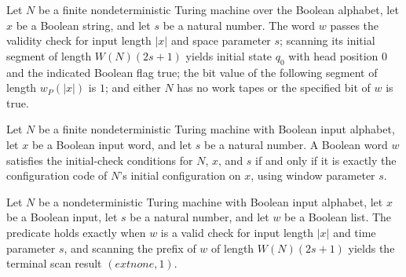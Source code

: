 \begin{definition}
\label{Complexity.Codec.InitChk}
\leanok
{}
Let $N$ be a finite nondeterministic Turing machine over the Boolean alphabet, let $x$
be a Boolean string, and let $s$ be a natural number. The word $w$ passes the validity
check for input length $|x|$ and space parameter $s$; scanning its initial segment of
length $W(N)(2s+1)$ yields initial state $q_0$ with head position $0$ and the indicated
Boolean flag true; the bit value of the following segment of length $w_P(|x|)$ is $1$;
and either $N$ has no work tapes or the specified bit of $w$ is true.
\end{definition}

\begin{theorem}
\label{Complexity.Codec.initChk_iff}
\leanok
{}
Let $N$ be a finite nondeterministic Turing machine with Boolean input alphabet, let $x$
be a Boolean input word, and let $s$ be a natural number. A Boolean word $w$ satisfies
the initial-check conditions for $N$, $x$, and $s$ if and only if it is exactly the
configuration code of $N$'s initial configuration on $x$, using window parameter $s$.
\end{theorem}

\begin{definition}
\label{Complexity.Codec.AcceptChk}
\leanok
{}
Let $N$ be a nondeterministic Turing machine with Boolean input alphabet, let $x$ be a
Boolean input, let $s$ be a natural number, and let $w$ be a Boolean list. The predicate
holds exactly when $w$ is a valid check for input length $|x|$ and time parameter $s$,
and scanning the prefix of $w$ of length $W(N)(2s+1)$ yields the terminal scan result
$(	ext{none},1)$.
\end{definition}

